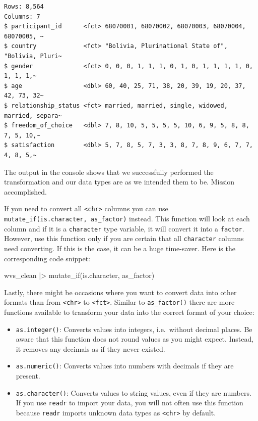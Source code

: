 \documentclass[
  letterpaper,
]{krantz}
\makeatletter
\newenvironment{Shaded}{\begin{snugshade}}{\end{snugshade}}
\newcommand{\FunctionTok}[1]{\textcolor[rgb]{0.28,0.35,0.67}{#1}}
\newcommand{\NormalTok}[1]{\textcolor[rgb]{0.00,0.23,0.31}{#1}}
\newcommand{\SpecialCharTok}[1]{\textcolor[rgb]{0.37,0.37,0.37}{#1}}
\newenvironment{kframe}{%
\medskip{}
\setlength{\fboxsep}{.8em}
 \def\at@end@of@kframe{}%
 \ifinner\ifhmode%
  \def\at@end@of@kframe{\end{minipage}}%
  \begin{minipage}{\columnwidth}%
 \fi\fi%
 \def\FrameCommand##1{\hskip\@totalleftmargin \hskip-\fboxsep
 \colorbox{shadecolor}{##1}\hskip-\fboxsep
     \hskip-\linewidth \hskip-\@totalleftmargin \hskip\columnwidth}%
 \MakeFramed {\advance\hsize-\width
   \@totalleftmargin\z@ \linewidth\hsize
   \@setminipage}}%
 {\par\unskip\endMakeFramed%
 \at@end@of@kframe}
\renewenvironment{Shaded}{\begin{kframe}}{\end{kframe}}
\makeatother
\begin{document}
\begin{verbatim}
Rows: 8,564
Columns: 7
$ participant_id      <fct> 68070001, 68070002, 68070003, 68070004, 68070005, ~
$ country             <fct> "Bolivia, Plurinational State of", "Bolivia, Pluri~
$ gender              <fct> 0, 0, 0, 1, 1, 1, 0, 1, 0, 1, 1, 1, 1, 0, 1, 1, 1,~
$ age                 <dbl> 60, 40, 25, 71, 38, 20, 39, 19, 20, 37, 42, 73, 32~
$ relationship_status <fct> married, married, single, widowed, married, separa~
$ freedom_of_choice   <dbl> 7, 8, 10, 5, 5, 5, 5, 10, 6, 9, 5, 8, 8, 7, 5, 10,~
$ satisfaction        <dbl> 5, 7, 8, 5, 7, 3, 3, 8, 7, 8, 9, 6, 7, 7, 4, 8, 5,~
\end{verbatim}

The output in the console shows that we successfully performed the
transformation and our data types are as we intended them to be. Mission
accomplished.

If you need to convert all \texttt{\textless{}chr\textgreater{}} columns
you can use \texttt{mutate\_if(is.character,\ as\_factor)} instead. This
function will look at each column and if it is a \texttt{character} type
variable, it will convert it into a \texttt{factor}. However, use this
function only if you are certain that all \texttt{character} columns
need converting. If this is the case, it can be a huge time-saver. Here
is the corresponding code snippet:

\begin{Shaded}
\begin{Highlighting}[]
\NormalTok{wvs\_clean }\SpecialCharTok{|\textgreater{}}
  \FunctionTok{mutate\_if}\NormalTok{(is.character, as\_factor)}
\end{Highlighting}
\end{Shaded}

Lastly, there might be occasions where you want to convert data into
other formats than from \texttt{\textless{}chr\textgreater{}} to
\texttt{\textless{}fct\textgreater{}}. Similar to \texttt{as\_factor()}
there are more functions available to transform your data into the
correct format of your choice:

\begin{itemize}
\item
  \texttt{as.integer()}: Converts values into integers, i.e.~without
  decimal places. Be aware that this function does not round values as
  you might expect. Instead, it removes any decimals as if they never
  existed.
\item
  \texttt{as.numeric()}: Converts values into numbers with decimals if
  they are present.
\item
  \texttt{as.character()}: Converts values to string values, even if
  they are numbers. If you use \texttt{readr} to import your data, you
  will not often use this function because \texttt{readr} imports
  unknown data types as \texttt{\textless{}chr\textgreater{}} by
  default.
\end{itemize}
\end{document}
